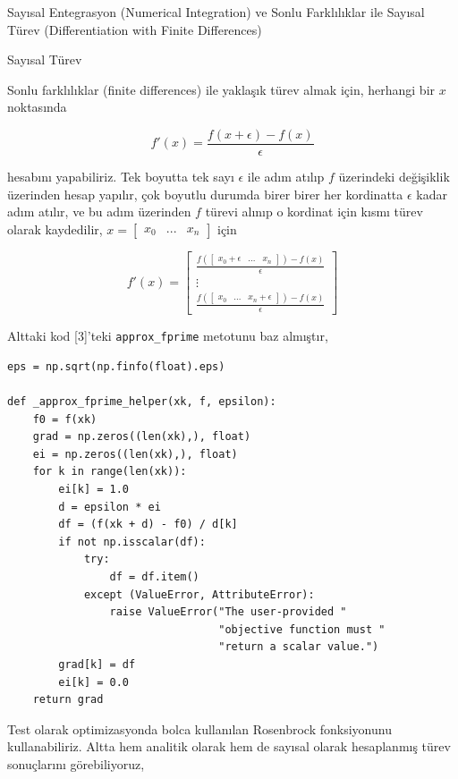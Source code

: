 \documentclass[12pt,fleqn]{article}\usepackage{../../common}
\begin{document}
Sayısal Entegrasyon (Numerical Integration) ve Sonlu Farklılıklar ile Sayısal Türev (Differentiation with Finite Differences)

Sayısal Türev

Sonlu farklılıklar (finite differences) ile yaklaşık türev almak için,
herhangi bir $x$ noktasında

$$
f'(x) = \frac{f(x + \epsilon) - f(x)}{\epsilon}
$$

hesabını yapabiliriz. Tek boyutta tek sayı $\epsilon$ ile adım atılıp $f$
üzerindeki değişiklik üzerinden hesap yapılır, çok boyutlu durumda birer
birer her kordinatta $\epsilon$ kadar adım atılır, ve bu adım üzerinden $f$
türevi alınıp o kordinat için kısmı türev olarak kaydedilir, $x =
\left[\begin{array}{ccc} x_0 & ... & x_n \end{array}\right]$ için

$$
f'(x) = \left[\begin{array}{c}
\frac{ f \left( [\begin{array}{ccc} x_0 + \epsilon & ... & x_n \end{array}]\right) - f(x)}{\epsilon} \\
\vdots \\
\frac{ f \left( [\begin{array}{ccc} x_0  & ... & x_n+\epsilon \end{array}]\right) - f(x)}{\epsilon} 
\end{array}\right]
$$

Alttaki kod [3]'teki \verb!approx_fprime! metotunu
baz almıştır, 

\begin{verbatim}
eps = np.sqrt(np.finfo(float).eps)

def _approx_fprime_helper(xk, f, epsilon):
    f0 = f(xk)
    grad = np.zeros((len(xk),), float)
    ei = np.zeros((len(xk),), float)
    for k in range(len(xk)):
        ei[k] = 1.0
        d = epsilon * ei
        df = (f(xk + d) - f0) / d[k]
        if not np.isscalar(df):
            try:
                df = df.item()
            except (ValueError, AttributeError):
                raise ValueError("The user-provided "
                                 "objective function must "
                                 "return a scalar value.")
        grad[k] = df
        ei[k] = 0.0
    return grad
\end{verbatim}

Test olarak optimizasyonda bolca kullanılan Rosenbrock fonksiyonunu
kullanabiliriz. Altta hem analitik olarak hem de sayısal olarak hesaplanmış
türev sonuçlarını görebiliyoruz,
\end{document}
